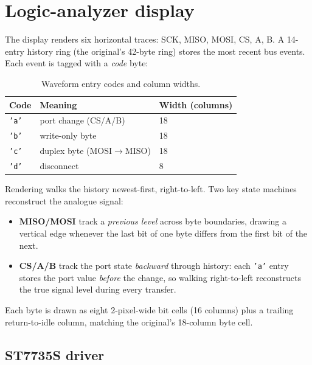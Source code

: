 \documentclass[11pt,a4paper]{article}
\begin{document}
\section{Logic-analyzer display}

The display renders six horizontal traces: SCK, MISO, MOSI, CS, A, B. A
14-entry history ring (the original's 42-byte ring) stores the most recent
bus events. Each event is tagged with a \emph{code} byte:

\begin{table}[h!]
\centering
\begin{tabular}{@{}lll@{}}
\toprule
\textbf{Code} & \textbf{Meaning} & \textbf{Width (columns)}\\
\midrule
\texttt{'a'} & port change (CS/A/B) & 18\\
\texttt{'b'} & write-only byte      & 18\\
\texttt{'c'} & duplex byte (MOSI$\rightarrow$MISO) & 18\\
\texttt{'d'} & disconnect           & 8\\
\bottomrule
\end{tabular}
\caption{Waveform entry codes and column widths.}
\label{tab:codes}
\end{table}

Rendering walks the history newest-first, right-to-left. Two key state
machines reconstruct the analogue signal:

\begin{itemize}
\item \textbf{MISO/MOSI} track a \emph{previous level} across byte
  boundaries, drawing a vertical edge whenever the last bit of one byte
  differs from the first bit of the next.
\item \textbf{CS/A/B} track the port state \emph{backward} through history:
  each \texttt{'a'} entry stores the port value \emph{before} the change, so
  walking right-to-left reconstructs the true signal level during every
  transfer.
\end{itemize}

Each byte is drawn as eight 2-pixel-wide bit cells (16 columns) plus a
trailing return-to-idle column, matching the original's 18-column byte cell.

\subsection{ST7735S driver}
\end{document}
